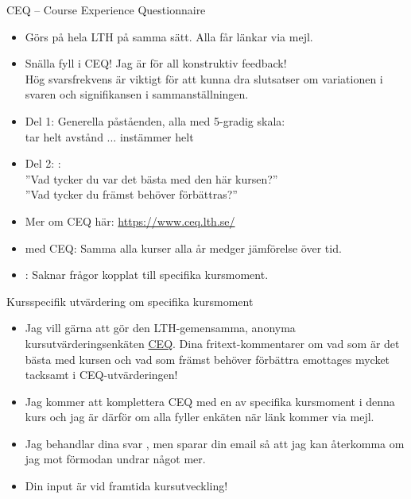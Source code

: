 \begin{Slide}{CEQ -- Course Experience Questionnaire}\SlideFontSmall
\begin{itemize}
\item Görs på hela LTH på samma sätt. Alla får länkar via mejl.
\item Snälla fyll i CEQ! Jag är  för all konstruktiv feedback! \\ Hög svarsfrekvens är viktigt för att kunna dra slutsatser om variationen i svaren och signifikansen i sammanställningen.
\item Del 1: Generella påståenden, alla med 5-gradig skala: \\ tar helt avstånd ... instämmer helt
\item Del 2: : \\
''Vad  tycker  du  var  det  bästa  med  den här  kursen?'' \\
''Vad  tycker  du  främst  behöver  förbättras?''
\item Mer om CEQ här: \url{https://www.ceq.lth.se/}
\item {} med CEQ: Samma alla kurser alla år medger jämförelse över tid.
\item {}: Saknar frågor kopplat till specifika kursmoment.
\end{itemize}
\end{Slide}

\begin{Slide}{Kursspecifik utvärdering om specifika kursmoment}\SlideFontSmall
\begin{itemize}
\item Jag vill gärna att  gör den LTH-gemensamma, anonyma kursutvärderingsenkäten \href{https://www.ceq.lth.se/}{CEQ}. Dina fritext-kommentarer om vad som är det bästa med kursen och vad som främst behöver förbättra emottages mycket tacksamt i CEQ-utvärderingen!
\item Jag kommer att komplettera CEQ med en  av specifika kursmoment i denna kurs och jag är därför  om alla fyller enkäten när länk kommer via mejl.
\item Jag behandlar dina svar , men sparar din email så att jag kan återkomma om jag mot förmodan undrar något mer.
\item Din input är  vid framtida kursutveckling!
\end{itemize}
\end{Slide}

